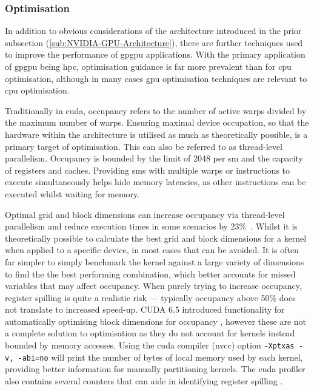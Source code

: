     \subsubsection{Optimisation}
      In addition to obvious considerations of the architecture introduced in the prior subsection (\ref{sub:NVIDIA-GPU-Architecture}), there are further techniques used to improve the performance of \gls{gpgpu} applications. With the primary application of \gls{gpgpu} being \gls{hpc}, optimisation guidance is far more prevalent than for \gls{cpu} optimisation, although in many cases \gls{gpu} optimisation techniques are relevant to \gls{cpu} optimisation.
      
      Traditionally in \gls{cuda}, occupancy refers to the number of active warps divided by the maximum number of warps. Ensuring maximal device occupation, so that the hardware within the architecture is utilised as much as theoretically possible, is a primary target of optimisation. This can also be referred to as thread-level parallelism. Occupancy is bounded by the limit of 2048 per \gls{sm} and the capacity of registers and caches. Providing \glspl{sm} with multiple warps or instructions to execute simultaneously helps hide memory latencies, as other instructions can be executed whilst waiting for memory.
      
      Optimal grid and block dimensions can increase occupancy via thread-level parallelism and reduce execution times in some scenarios by 23\%\ \cite{TGD13}. Whilst it is theoretically possible to calculate the best grid and block dimensions for a kernel when applied to a specific device, in most cases that can be avoided. It is often far simpler to simply benchmark the kernel against a large variety of dimensions to find the the best performing combination, which better accounts for missed variables that may affect occupancy. When purely trying to increase occupancy, register spilling is quite a realistic risk --- typically occupancy above 50\% does not translate to increased speed-up. CUDA 6.5 introduced functionality for automatically optimising block dimensions for occupancy \cite{NV_OCCUPANCY}, however these are not a complete solution to optimisation as they do not account for kernels instead bounded by memory accesses. Using the \gls{cuda} compiler (\gls{nvcc}) option \lstinline!-Xptxas -v, -abi=no! will print the number of bytes of local memory used by each kernel, providing better information for manually partitioning kernels. The \gls{cuda} profiler also contains several counters that can aide in identifying register spilling \cite{PM11}.
      

